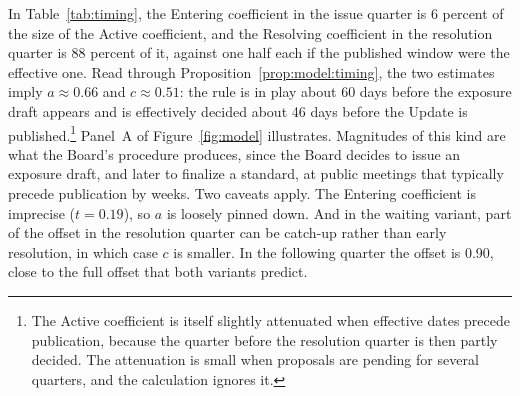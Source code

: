 In Table~\ref{tab:timing}, the Entering coefficient in the issue quarter is 6 percent of the size of the Active coefficient, and the Resolving coefficient in the resolution quarter is 88 percent of it, against one half each if the published window were the effective one. %
Read through Proposition~\ref{prop:model:timing}, the two estimates imply $a\approx 0.66$ and $c\approx 0.51$: the rule is in play about 60 days before the exposure draft appears and is effectively decided about 46 days before the Update is published.\footnote{The Active coefficient is itself slightly attenuated when effective dates precede publication, because the quarter before the resolution quarter is then partly decided. The attenuation is small when proposals are pending for several quarters, and the calculation ignores it.} Panel~A of Figure~\ref{fig:model} illustrates. Magnitudes of this kind are what the Board's procedure produces, since the Board decides to issue an exposure draft, and later to finalize a standard, at public meetings that typically precede publication by weeks. Two caveats apply. The Entering coefficient is imprecise ($t=0.19$), so $a$ is loosely pinned down. And in the waiting variant, part of the offset in the resolution quarter can be catch-up rather than early resolution, in which case $c$ is smaller. In the following quarter the offset is 0.90, close to the full offset that both variants predict. %

